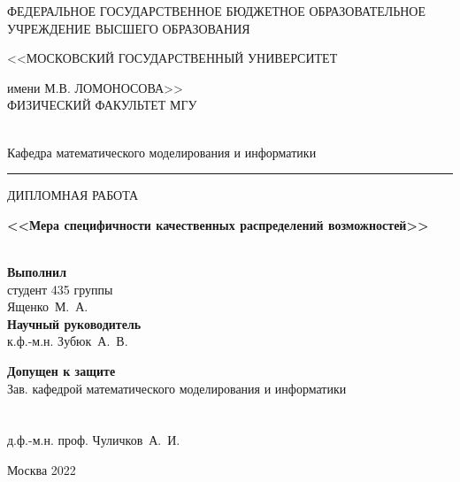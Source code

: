 \documentclass[a4paper, 14pt]{extarticle}
\begin{document}
\begin{titlepage}
\begin{center}



{\small ФЕДЕРАЛЬНОЕ ГОСУДАРСТВЕННОЕ БЮДЖЕТНОЕ ОБРАЗОВАТЕЛЬНОЕ 
УЧРЕЖДЕНИЕ ВЫСШЕГО ОБРАЗОВАНИЯ 

<<МОСКОВСКИЙ ГОСУДАРСТВЕННЫЙ УНИВЕРСИТЕТ

имени М.В. ЛОМОНОСОВА>>
\ \\[1ex]
ФИЗИЧЕСКИЙ ФАКУЛЬТЕТ МГУ }
\ \\[0.8ex]
Кафедра математического моделирования и информатики
\ \\[0.8ex] 
\hrule 

\vspace{1cm}

{\large ДИПЛОМНАЯ РАБОТА}

{\large\bf <<Мера специфичности качественных распределений возможностей>> \\}
\ \\[2ex]
\begin{flushright}
\begin{minipage}{0.42\textwidth}
{\bf Выполнил}  \\ студент 435 группы \\ Ященко~М.~А.
\vspace{8mm}
\vspace{1mm}
{\small }
\\[1ex]
{\bf Научный руководитель} \\ к.ф.-м.н. Зубюк~А.~В.

\vspace{30mm}

\end{minipage}
\end{flushright}
\end{center}
\hspace{3em}

\vfill
\begin{flushleft}
\begin{minipage}{0.4\textwidth}
{\bf Допущен к защите} \\ {\small Зав. кафедрой математического моделирования  и информатики\\\\
\underline{\hspace{6cm}}\\д.ф.-м.н. проф. Чуличков~А.~И.}
\vspace{8mm}
\vspace{1mm}
{\small }
\end{minipage}
\end{flushleft}

\vfill
\begin{center}
Москва
\vfill
2022
\end{center}

\end{titlepage}
\end{document}
